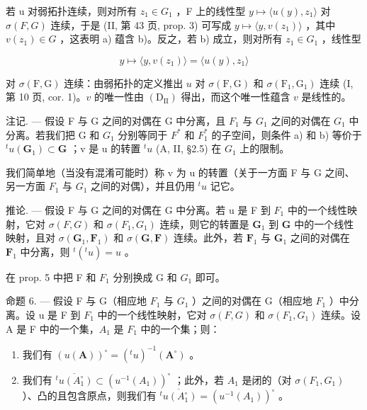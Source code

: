 若 u 对弱拓扑连续，则对所有 \(z_{1} \in G_{1}\) ，F 上的线性型 \(y \mapsto \langle u(y), z_{1} \rangle\) 对 \(\sigma(F, G)\) 连续，于是 (II, 第 43 页, prop. 3) 可写成 \(y \mapsto \langle y, v(z_{1}) \rangle\) ，其中 \(v(z_{1}) \in G\) ，这表明 a) 蕴含 b)。反之，若 b) 成立，则对所有 \(z_{1} \in G_{1}\) ，线性型

\[
y \mapsto \langle y, v (z _ {1}) \rangle = \langle u (y), z _ {1} \rangle
\]

对 \(\sigma(\mathrm{F},\mathrm{G})\) 连续：由弱拓扑的定义推出 \(u\) 对 \(\sigma(\mathrm{F},\mathrm{G})\) 和 \(\sigma(\mathrm{F}_1,\mathrm{G}_1)\) 连续 (I, 第 10 页, cor. 1)。\(v\) 的唯一性由 \((\mathrm{D}_{\mathrm{II}})\) 得出，而这个唯一性蕴含 \(v\) 是线性的。

注记. --- 假设 F 与 G 之间的对偶在 G 中分离，且 \(F_{1}\) 与 \(G_{1}\) 之间的对偶在 \(G_{1}\) 中分离。若我们把 G 和 \(G_{1}\) 分别等同于 \(F^{*}\) 和 \(F_{1}^{*}\) 的子空间，则条件 a) 和 b) 等价于 \(^{t}u(\mathbf{G}_{1}) \subset \mathbf{G}\) ；v 是 u 的转置 \(^{t}u\) (A, II, §2.5) 在 \(G_{1}\) 上的限制。

我们简单地（当没有混淆可能时）称 v 为 u 的转置（关于一方面 F 与 G 之间、另一方面 \(F_{1}\) 与 \(G_{1}\) 之间的对偶），并且仍用 \(^{t}u\) 记它。

推论. --- 假设 F 与 G 之间的对偶在 G 中分离。若 u 是 F 到 \(F_{1}\) 中的一个线性映射，它对 \(\sigma(F, G)\) 和 \(\sigma(F_{1}, G_{1})\) 连续，则它的转置是 \(\mathbf{G}_1\) 到 \(\mathbf{G}\) 中的一个线性映射，且对 \(\sigma (\mathbf{G}_1,\mathbf{F}_1)\) 和 \(\sigma (\mathbf{G},\mathbf{F})\) 连续。此外，若 \(\mathbf{F}_1\) 与 \(\mathbf{G}_1\) 之间的对偶在 \(\mathbf{F}_1\) 中分离，则 \(^{t}(^{t} u) = u\) 。

在 prop. 5 中把 F 和 \(F_{1}\) 分别换成 G 和 \(G_{1}\) 即可。

命题 6. --- 假设 F 与 G（相应地 \(F_{1}\) 与 \(G_{1}\) ）之间的对偶在 G（相应地 \(F_{1}\) ）中分离。设 u 是 F 到 \(F_{1}\) 中的一个线性映射，它对 \(\sigma(F, G)\) 和 \(\sigma(F_{1}, G_{1})\) 连续。设 A 是 F 中的一个集，\(A_{1}\) 是 \(F_{1}\) 中的一个集；则：

\begin{enumerate}
\def\labelenumi{(\roman{enumi})}
\item
  我们有 \((u(\mathbf{A}))^{\circ} = ({}^{t} u)^{-1} (\mathbf{A}^{\circ})\) 。
\item
  我们有 \(\overline{{}^{t}u(A_1^\circ)}\subset (u^{-1}(A_1))^{\circ}\) ；此外，若 \(A_1\) 是闭的（对 \(\sigma(F_1,G_1)\) ）、凸的且包含原点，则我们有 \(\overline{{}^{t}u(A_1^\circ)} = (u^{-1}(A_1))^{\circ}\) 。
\end{enumerate}

